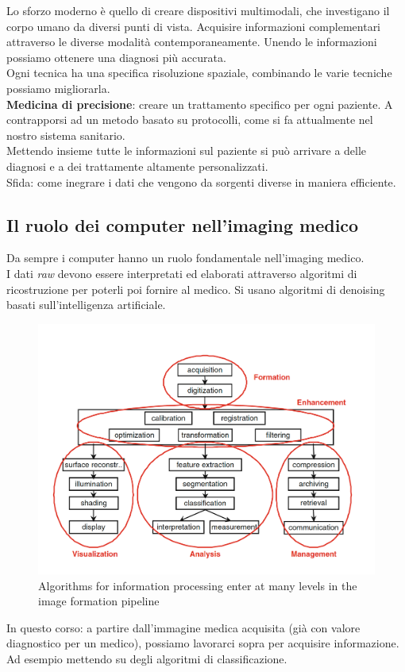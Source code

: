 Lo sforzo moderno è quello di creare dispositivi multimodali, che investigano il corpo umano da diversi punti di vista. Acquisire informazioni complementari attraverso le diverse modalità contemporaneamente. Unendo le informazioni possiamo ottenere una diagnosi più accurata.\\
Ogni tecnica ha una specifica risoluzione spaziale, combinando le varie tecniche possiamo migliorarla.\\

\textbf{Medicina di precisione}: creare un trattamento specifico per ogni paziente. A contrapporsi ad un metodo basato su protocolli, come si fa attualmente nel nostro sistema sanitario.\\
Mettendo insieme tutte le informazioni sul paziente si può arrivare a delle diagnosi e a dei trattamente altamente personalizzati.\\
Sfida: come inegrare i dati che vengono da sorgenti diverse in maniera efficiente.\\

\subsection{Il ruolo dei computer nell'imaging medico}
Da sempre i computer hanno un ruolo fondamentale nell'imaging medico.\\
I dati \textit{raw} devono essere interpretati ed elaborati attraverso algoritmi di ricostruzione per poterli poi fornire al medico. Si usano algoritmi di denoising basati sull'intelligenza artificiale.\\



\begin{figure}[ht]
	\centering
	\includegraphics[width=1\linewidth]{figure_med/computers_med_img}
	\caption{Algorithms for
		information processing
		enter at many levels in
		the image formation
		pipeline}
\end{figure}
\FloatBarrier
In questo corso: a partire dall'immagine medica acquisita (già con valore diagnostico per un medico), possiamo lavorarci sopra per acquisire informazione. Ad esempio mettendo su degli algoritmi di classificazione.\\

